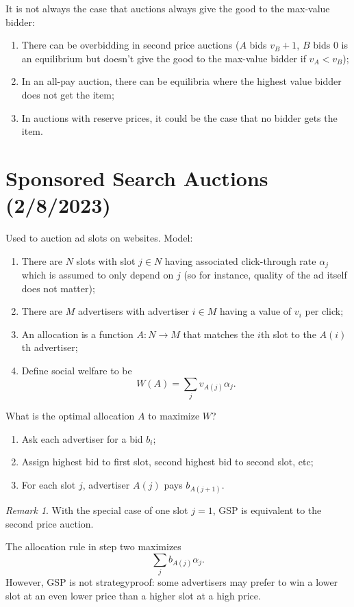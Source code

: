 \documentclass[dvipsnames]{article}
\theoremstyle{definition}
\theoremstyle{remark}
\newtheorem*{remark}{Remark}
\newenvironment{mech}[1]{\begin{tcolorbox}[colback=red!5!white,colframe=red!75!black,title={#1}]}{\end{tcolorbox}}
\begin{document}
It is not always the case that auctions always give the good to the max-value bidder:
\begin{enumerate}
	\item There can be overbidding in second price auctions ($A$ bids $v_B+1$, $B$ bids $0$ is an equilibrium but doesn't give the good to the max-value bidder if $v_A < v_B$);
	\item In an all-pay auction, there can be equilibria where the highest value bidder does not get the item;
	\item In auctions with reserve prices, it could be the case that no bidder gets the item.
\end{enumerate}


\newpage

\section{Sponsored Search Auctions (2/8/2023)}

Used to auction ad slots on websites. Model:
\begin{enumerate}
	\item There are $N$ slots with slot $j \in N$ having associated click-through rate $\alpha_j$ which is assumed to only depend on $j$ (so for instance, quality of the ad itself does not matter);
	\item There are $M$ advertisers with advertiser $i \in M$ having a value of $v_i$ per click;
	\item An allocation is a function $A: N \to M$ that matches the $i$th slot to the $A(i)$th advertiser;
	\item Define social welfare to be
	$$W(A) = \sum_j v_{A(j)} \alpha_j.$$
\end{enumerate}
What is the optimal allocation $A$ to maximize $W$?

\begin{mech}{General Second Price Auction}
	\begin{enumerate}
		\item Ask each advertiser for a bid $b_i$;
		\item Assign highest bid to first slot, second highest bid to second slot, etc;
		\item For each slot $j$, advertiser $A(j)$ pays $b_{A(j+1)}$.
	\end{enumerate}
\end{mech}

\begin{remark}
	With the special case of one slot $j=1$, GSP is equivalent to the second price auction.
\end{remark}
The allocation rule in step two maximizes
$$\sum_j b_{A(j)}\alpha_j.$$
However, GSP is not strategyproof: some advertisers may prefer to win a lower slot at an even lower price than a higher slot at a high price. 
\end{document}
